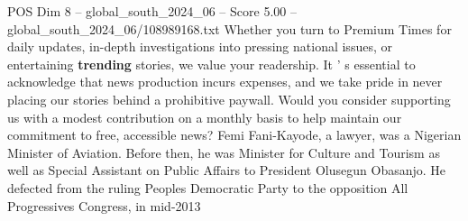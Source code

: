 \begin{textsample}{POS Dim 8 – global\_south\_2024\_06 – Score 5.00 – global\_south\_2024\_06/108989168.txt}
Whether you turn to Premium Times for daily updates, in-depth investigations into pressing national issues, or entertaining \textbf{trending} stories, we value your readership.
It ' s essential to acknowledge that news production incurs expenses, and we take pride in never placing our stories behind a prohibitive paywall.
Would you consider supporting us with a modest contribution on a monthly basis to help maintain our commitment to free, accessible news?
Femi Fani-Kayode, a lawyer, was a Nigerian Minister of Aviation.
Before then, he was Minister for Culture and Tourism as well as Special Assistant on Public Affairs to President Olusegun Obasanjo.
He defected from the ruling Peoples Democratic Party to the opposition All Progressives Congress, in mid-2013

\end{textsample}
